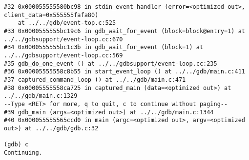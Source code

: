 \documentclass{report}
\begin{document}
\begin{verbatim}
#32 0x000055555580bc98 in stdin_event_handler (error=<optimized out>, client_data=0x555555fafa80)
    at ../../gdb/event-top.c:525
#33 0x0000555555bc19c6 in gdb_wait_for_event (block=block@entry=1) at ../../gdbsupport/event-loop.cc:670
#34 0x0000555555bc1c3b in gdb_wait_for_event (block=1) at ../../gdbsupport/event-loop.cc:569
#35 gdb_do_one_event () at ../../gdbsupport/event-loop.cc:235
#36 0x00005555558c8b55 in start_event_loop () at ../../gdb/main.c:411
#37 captured_command_loop () at ../../gdb/main.c:471
#38 0x00005555558ca725 in captured_main (data=<optimized out>) at ../../gdb/main.c:1329
--Type <RET> for more, q to quit, c to continue without paging--
#39 gdb_main (args=<optimized out>) at ../../gdb/main.c:1344
#40 0x000055555565ccd0 in main (argc=<optimized out>, argv=<optimized out>) at ../../gdb/gdb.c:32

(gdb) c
Continuing.


\end{verbatim}
\end{document}
